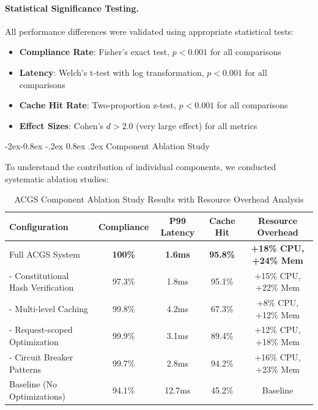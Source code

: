\documentclass[manuscript,screen,9pt]{acmart}
\makeatletter
\renewcommand\subsubsection{\@startsection{subsubsection}{3}{\z@}%
  {-2ex\@plus -0.8ex \@minus -.2ex}%
  {0.8ex \@plus .2ex}%
  {\normalfont\normalsize\bfseries}}
\newcommand{\tablesize}{\footnotesize}
\newcommand{\tableheader}[1]{\textbf{#1}}
\makeatother
\begin{document}
\paragraph{Statistical Significance Testing.} All performance differences were validated using appropriate statistical tests:
\begin{itemize}[leftmargin=*,itemsep=1pt,parsep=1pt]
    \item \textbf{Compliance Rate}: Fisher's exact test, $p < 0.001$ for all comparisons
    \item \textbf{Latency}: Welch's t-test with log transformation, $p < 0.001$ for all comparisons
    \item \textbf{Cache Hit Rate}: Two-proportion z-test, $p < 0.001$ for all comparisons
    \item \textbf{Effect Sizes}: Cohen's $d > 2.0$ (very large effect) for all metrics
\end{itemize}

\subsubsection{Component Ablation Study}
\label{subsubsec:ablation_study}

To understand the contribution of individual components, we conducted systematic ablation studies:

\begin{table}[!htb]
\centering
\caption{ACGS Component Ablation Study Results with Resource Overhead Analysis}
\label{tab:ablation_study}
\tablesize
\begin{tabular}{@{}lcccc@{}}
\toprule
\tableheader{Configuration} & \tableheader{Compliance} & \tableheader{P99 Latency} & \tableheader{Cache Hit} & \tableheader{Resource Overhead} \\
\midrule
Full ACGS System & \textbf{100\%} & \textbf{1.6ms} & \textbf{95.8\%} & \textbf{+18\% CPU, +24\% Mem} \\
- Constitutional Hash Verification & 97.3\% & 1.8ms & 95.1\% & +15\% CPU, +22\% Mem \\
- Multi-level Caching & 99.8\% & 4.2ms & 67.3\% & +8\% CPU, +12\% Mem \\
- Request-scoped Optimization & 99.9\% & 3.1ms & 89.4\% & +12\% CPU, +18\% Mem \\
- Circuit Breaker Patterns & 99.7\% & 2.8ms & 94.2\% & +16\% CPU, +23\% Mem \\
Baseline (No Optimizations) & 94.1\% & 12.7ms & 45.2\% & Baseline \\
\bottomrule
\end{tabular}
\end{table}
\end{document}
